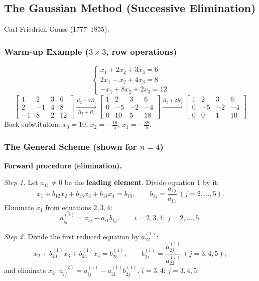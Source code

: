 \documentclass[hidelinks]{article}
\begin{document}
\subsection{The Gaussian Method (Successive Elimination)}

Carl Friedrich Gauss (1777--1855).

\subsubsection{Warm-up Example ($3\times3$, row operations)}

\[
\begin{cases}
x_1+2x_2+3x_3=6\\
2x_1-x_2+4x_3=8\\
-x_1+8x_2+2x_3=12
\end{cases}
\]
\[
\left[\begin{array}{rrr|r}1&2&3&6\\2&-1&4&8\\-1&8&2&12\end{array}\right]
\xrightarrow[R_3+R_1]{R_2-2R_1}
\left[\begin{array}{rrr|r}1&2&3&6\\0&-5&-2&-4\\0&10&5&18\end{array}\right]
\xrightarrow{R_3+2R_2}
\left[\begin{array}{rrr|r}1&2&3&6\\0&-5&-2&-4\\0&0&1&10\end{array}\right]
\]
Back substitution: $x_3=10$, $x_2=-\frac{16}{5}$, $x_1=-\frac{88}{5}$.

\subsubsection{The General Scheme (shown for $n=4$)}

\textbf{Forward procedure (elimination).}

\emph{Step 1.} Let $a_{11}\neq0$ be the \textbf{leading element}. Divide equation 1 by it:
\[
x_1+b_{12}x_2+b_{13}x_3+b_{14}x_4=b_{15},\qquad b_{1j}=\frac{a_{1j}}{a_{11}}\ (j=2,\dots,5).
\]
Eliminate $x_1$ from equations $2,3,4$:
\[
a^{(1)}_{ij}=a_{ij}-a_{i1}b_{1j},\qquad i=2,3,4;\ j=2,\dots,5 .
\]

\emph{Step 2.} Divide the first reduced equation by $a^{(1)}_{22}$:
\[
x_2+b^{(1)}_{23}x_3+b^{(1)}_{24}x_4=b^{(1)}_{25},\qquad b^{(1)}_{2j}=\frac{a^{(1)}_{2j}}{a^{(1)}_{22}}\ (j=3,4,5),
\]
and eliminate $x_2$: $a^{(2)}_{ij}=a^{(1)}_{ij}-a^{(1)}_{i2}b^{(1)}_{2j}$, $i=3,4$; $j=3,4,5$.
\end{document}
